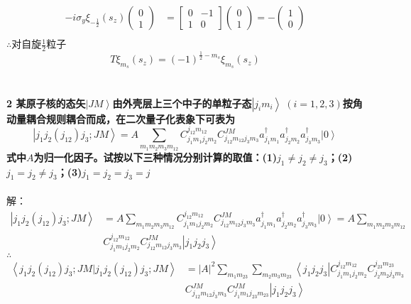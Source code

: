 \documentclass[12pt]{article}
\numberwithin{equation}{section}	 %
\begin{document}
\begin{spacing}{1.5}
\begin{equation}
\begin{aligned}
-i\sigma_{y}\xi_{-\frac{1}{2}}(s_{z})\begin{pmatrix} 0 \\ 1  \end{pmatrix} &= \begin{bmatrix} 0 & -1 \\ 1 & 0 \end{bmatrix} \begin{pmatrix} 0 \\ 1 \end{pmatrix} = -\begin{pmatrix} 1 \\ 0 \end{pmatrix} \\
\end{aligned}
\end{equation}
$\therefore$对自旋$\displaystyle \frac{1}{2}$粒子
\begin{equation}
T\xi_{m_{s}}(s_{z}) = (-1)^{\frac{1}{2}-m_{s}}\xi_{m_{s}}(s_{z})
\end{equation}
~\\
~\\
\textbf{2 \quad 某原子核的态矢$\left|JM\right>$由外壳层上三个中子的单粒子态$\left|j_{i}m_{i}\right> \; (i=1,2,3)$按角动量耦合规则耦合而成，在二次量子化表象下可表为
\begin{equation}\nonumber 		%
\left|j_{1}j_{2}(j_{12})j_{3};JM\right> = A\sum_{m_{1}m_{2}m_{3}m_{12}}C^{j_{12}m_{12}}_{j_{1}m_{1}j_{2}m_{2}}C^{JM}_{j_{12}m_{12}j_{3}m_{3}}a^{\dag}_{j_{1}m_{1}}a^{\dag}_{j_{2}m_{2}}a^{\dag}_{j_{3}m_{3}}\left|0\right>
\end{equation}
式中$A$为归一化因子。试按以下三种情况分别计算的取值：(1)$j_{1}\ne j_{2}\ne j_{3}$；(2)$j_{1} = j_{2}\ne j_{3}$；(3)$j_{1} = j_{2} = j_{3} = j$
}\\
~\\
解：
\begin{align*}
\left|j_{1}j_{2}(j_{12})j_{3};JM\right> &= A\sum_{m_{1}m_{2}m_{3}m_{12}}C^{j_{12}m_{12}}_{j_{1}m_{1}j_{2}m_{2}}C^{JM}_{j_{12}m_{12}j_{3}m_{3}}a^{\dag}_{j_{1}m_{1}}a^{\dag}_{j_{2}m_{2}}a^{\dag}_{j_{3}m_{3}}\left|0\right> = A\sum_{m_{1}m_{2}m_{3}m_{12}} \\ &C^{j_{12}m_{12}}_{j_{1}m_{1}j_{2}m_{2}}C^{JM}_{j_{12}m_{12}j_{3}m_{3}}\left|j_{1}j_{2}j_{3}\right>
\end{align*}
$\therefore$
\begin{equation}
\begin{aligned}
\left<j_{1}j_{2}(j_{12})j_{3};JM|j_{1}j_{2}(j_{12})j_{3};JM\right> &= \left|A\right|^{2} \sum_{m_{1}m_{23}} \sum_{m_{2}m_{3}m_{23}} \left<  j_{1}j_{2}j_{3} \right| C^{j_{12}m_{12}}_{j_{1}m_{1}j_{2}m_{2}}C^{j_{23}m_{23}}_{j_{2}m_{2}j_{3}m_{3}} \\ &C^{JM}_{j_{12}m_{12}j_{3}m_{3}}C^{JM}_{j_{1}m_{1}j_{23}m_{23}} \left| j_{1}j_{2}j_{3} \right> \\

\end{aligned}
\end{equation}
\end{spacing}
\end{document}

